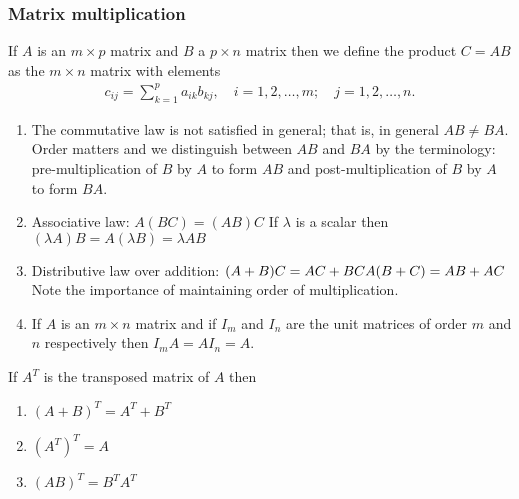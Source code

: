 \documentclass[12pt,a4paper,fleqn]{mycalc}
\begin{document}
	\subsubsection{Matrix multiplication}
	If \( A \) is an \( m \times p \) matrix and \( B \) a \( p \times n \) matrix then we define the product \( C = AB \) as the
	\( m \times n \) matrix with elements
	\begin{align*}
	c_{ij}=\sum_{k=1}^{p}a_{ik}b_{kj},\quad i=1,2,\dots,m;\quad j=1,2,\dots,n.
	\end{align*}
	\begin{tcolorbox}[title={Properties of multiplication}]
		\begin{enumerate}[i]
			\item The commutative law is not satisfied in general; that is, in general \( AB \neq BA. \) Order matters and we distinguish between \( AB \) and \( BA \) by the terminology: pre-multiplication of \( B \) by \( A \) to form \( AB \) and post-multiplication of \( B \) by \( A \) to form \( BA. \)
			\item Associative law: \( A(BC) = (AB)C \)
			If \( \lambda  \) is a scalar then \( (\lambda A)B = A(\lambda B) = \lambda AB \)
			\item Distributive law over addition:
			\( (A + B)C = AC + BC\\
			A(B + C) = AB + AC \)\\
			Note the importance of maintaining order of multiplication.
			\item If \( A \) is an \( m \times n \) matrix and if \( I_m \) and \( I_n \) are the unit matrices of order \( m \) and \( n \) respectively then \( I_mA=AI_n=A. \)
		\end{enumerate}
	\end{tcolorbox}
	\begin{tcolorbox}[title={Properties of the Transpose}]
		If \( A^{T} \) is the transposed matrix of \( A \) then
		\begin{enumerate}[i]
			\item \( (A + B)^{T} = A^{T} + B^{T} \)
			\item \( (A^{T})^{T} = A \)
			\item \( (AB)^{T} = B^{T}A^{T} \)
		\end{enumerate}
	\end{tcolorbox}
\end{document}
